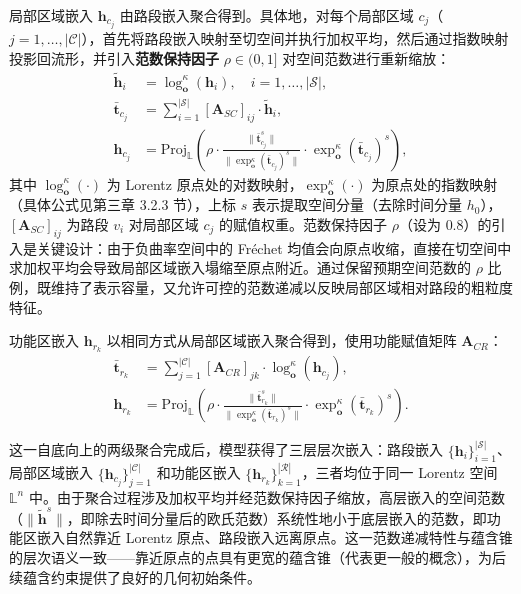 局部区域嵌入 $\mathbf{h}_{c_j}$ 由路段嵌入聚合得到。具体地，对每个局部区域 $c_j$（$j = 1, \dots, |\mathcal{C}|$），首先将路段嵌入映射至切空间并执行加权平均，然后通过指数映射投影回流形，并引入\textbf{范数保持因子} $\rho \in (0,1]$ 对空间范数进行重新缩放：
\begin{align}
    \tilde{\mathbf{h}}_i &= \log_{\mathbf{o}}^\kappa(\mathbf{h}_i), \quad i = 1, \dots, |\mathcal{S}|, \label{eq:seg_to_tangent} \\[3pt]
    \bar{\mathbf{t}}_{c_j} &= \sum_{i=1}^{|\mathcal{S}|} [\mathbf{A}_{SC}]_{ij} \cdot \tilde{\mathbf{h}}_i, \label{eq:tangent_mean_loc} \\[3pt]
    \mathbf{h}_{c_j} &= \text{Proj}_{\mathbb{L}}\!\left(
      \rho \cdot \frac{\|\bar{\mathbf{t}}_{c_j}^s\|}{\|\exp_{\mathbf{o}}^\kappa(\bar{\mathbf{t}}_{c_j})^s\|}
      \cdot \exp_{\mathbf{o}}^\kappa(\bar{\mathbf{t}}_{c_j})^s
    \right), \label{eq:locality_agg}
\end{align}
其中 $\log_{\mathbf{o}}^\kappa(\cdot)$ 为 Lorentz 原点处的对数映射，$\exp_{\mathbf{o}}^\kappa(\cdot)$ 为原点处的指数映射（具体公式见第三章 3.2.3 节），上标 $s$ 表示提取空间分量（去除时间分量 $h_0$），$[\mathbf{A}_{SC}]_{ij}$ 为路段 $v_i$ 对局部区域 $c_j$ 的赋值权重。范数保持因子 $\rho$（设为 $0.8$）的引入是关键设计：由于负曲率空间中的 Fréchet 均值会向原点收缩，直接在切空间中求加权平均会导致局部区域嵌入塌缩至原点附近。通过保留预期空间范数的 $\rho$ 比例，既维持了表示容量，又允许可控的范数递减以反映局部区域相对路段的粗粒度特征。

功能区嵌入 $\mathbf{h}_{r_k}$ 以相同方式从局部区域嵌入聚合得到，使用功能赋值矩阵 $\mathbf{A}_{CR}$：
\begin{align}
    \bar{\mathbf{t}}_{r_k} &= \sum_{j=1}^{|\mathcal{C}|} [\mathbf{A}_{CR}]_{jk} \cdot \log_{\mathbf{o}}^\kappa(\mathbf{h}_{c_j}), \label{eq:tangent_mean_reg} \\[3pt]
    \mathbf{h}_{r_k} &= \text{Proj}_{\mathbb{L}}\!\left(
      \rho \cdot \frac{\|\bar{\mathbf{t}}_{r_k}^s\|}{\|\exp_{\mathbf{o}}^\kappa(\bar{\mathbf{t}}_{r_k})^s\|}
      \cdot \exp_{\mathbf{o}}^\kappa(\bar{\mathbf{t}}_{r_k})^s
    \right). \label{eq:region_agg}
\end{align}

这一自底向上的两级聚合完成后，模型获得了三层层次嵌入：路段嵌入 $\{\mathbf{h}_i\}_{i=1}^{|\mathcal{S}|}$、局部区域嵌入 $\{\mathbf{h}_{c_j}\}_{j=1}^{|\mathcal{C}|}$ 和功能区嵌入 $\{\mathbf{h}_{r_k}\}_{k=1}^{|\mathcal{R}|}$，三者均位于同一 Lorentz 空间 $\mathbb{L}^n$ 中。由于聚合过程涉及加权平均并经范数保持因子缩放，高层嵌入的空间范数（$\|\tilde{\mathbf{h}}^s\|$，即除去时间分量后的欧氏范数）系统性地小于底层嵌入的范数，即功能区嵌入自然靠近 Lorentz 原点、路段嵌入远离原点。这一范数递减特性与蕴含锥的层次语义一致——靠近原点的点具有更宽的蕴含锥（代表更一般的概念），为后续蕴含约束提供了良好的几何初始条件。

